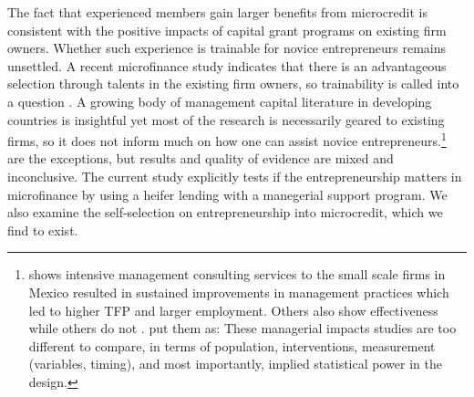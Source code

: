 	The fact that experienced members gain larger benefits from microcredit is consistent with the positive impacts of capital grant programs on existing firm owners. Whether such experience is trainable for novice entrepreneurs remains unsettled. A recent microfinance study indicates that there is an advantageous selection through talents in the existing firm owners, so trainability is called into a question \citep{Banerjee2019MFPovertyTrap}. A growing body of management capital literature in developing countries is insightful yet most of the research is necessarily geared to existing firms, so it does not inform much on how one can assist novice entrepreneurs.\footnote{\citet{BruhnKarlanSchoar2018} shows intensive management consulting services to the small scale firms in Mexico resulted in sustained improvements in management practices which led to higher TFP and larger employment. Others also show effectiveness \citep{Calderon2011, Berge2012, Bloometal2013} while others do not \citep{Bruhn2012, KarlanKnightUdry2015}. \citet{MckenzieWoodruff2013} put them as: These managerial impacts studies are too different to compare, in terms of population, interventions, measurement (variables, timing), and most importantly, implied statistical power in the design. } \citet{KarlanValvidia2011, BruhnZia2011, Argent2014} are the exceptions, but results and quality of evidence are mixed and inconclusive. The current study explicitly tests if the entrepreneurship matters in microfinance by using a heifer lending with a manegerial support program. We also examine the self-selection on entrepreneurship into microcredit, which we find to exist.%

